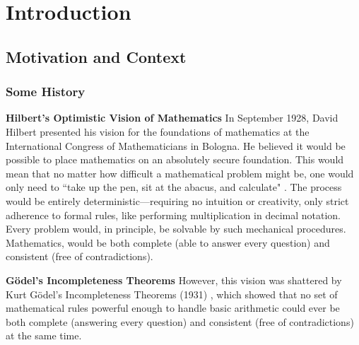 \chapter{Introduction}



\section{Motivation and Context}




\subsection*{Some History}

\noindent \textbf{Hilbert’s Optimistic Vision of Mathematics}
In September 1928, David Hilbert presented his vision for the foundations of mathematics at the International Congress of Mathematicians in Bologna. He believed it would be possible to place mathematics on an absolutely secure foundation. This would mean that no matter how difficult a mathematical problem might be, one would only need to ``take up the pen, sit at the abacus, and calculate" \cite{ferreiraProblemaDecisaoMaquina}. The process would be entirely deterministic—requiring no intuition or creativity, only strict adherence to formal rules, like performing multiplication in decimal notation. Every problem would, in principle, be solvable by such mechanical procedures. Mathematics, would be both complete (able to answer every question) and consistent (free of contradictions). 

\noindent \textbf{ Gödel’s Incompleteness Theorems} However, this vision was shattered by Kurt Gödel’s Incompleteness Theorems (1931) \cite{Godel}, which showed that no set of mathematical rules powerful enough to handle basic arithmetic could ever be both complete (answering every question) and consistent (free of contradictions) at the same time. 

